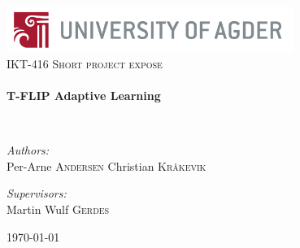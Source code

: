 

\begin{titlepage}
\begin{center}

\includegraphics[width=0.7\textwidth]{./uia_eng}~\\[2cm]


\textsc{\Large IKT-416 Short project expose}\\[0.5cm]

\HRule \\[0.4cm]
{ \huge \bfseries T-FLIP Adaptive Learning \\[0.4cm] }

\HRule \\[1.5cm]

\noindent
\begin{minipage}[t]{0.4\textwidth}
\begin{flushleft} \large
\emph{Authors:}\\
Per-Arne \textsc{Andersen}
Christian \textsc{Kråkevik}
\end{flushleft}
\end{minipage}%
\begin{minipage}[t]{0.4\textwidth}
\begin{flushright} \large
\emph{Supervisors:} \\

Martin Wulf \textsc{Gerdes}\\
\end{flushright}
\end{minipage}

\vfill

{\large \today}

\end{center}
\end{titlepage}